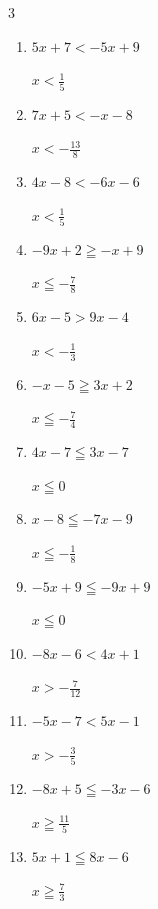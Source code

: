 \begin{multicols}{3}
\begin{enumerate}
        $\displaystyle x\leqq -\frac{7}{15}$

  \item $5x+7<-5x+9$

        $\displaystyle x<\frac{1}{5}$

  \item $7x+5<-x-8$

        $\displaystyle x<-\frac{13}{8}$

  \item $4x-8<-6x-6$

        $\displaystyle x<\frac{1}{5}$

  \item $-9x+2\geqq -x+9$

        $\displaystyle x\leqq -\frac{7}{8}$

  \item $6x-5>9x-4$

        $\displaystyle x<-\frac{1}{3}$

  \item $-x-5\geqq 3x+2$

        $\displaystyle x\leqq -\frac{7}{4}$

  \item $4x-7\leqq 3x-7$

        $\displaystyle x\leqq 0$

  \item $x-8\leqq -7x-9$

        $\displaystyle x\leqq -\frac{1}{8}$

  \item $-5x+9\leqq -9x+9$

        $\displaystyle x\leqq 0$

  \item $-8x-6<4x+1$

        $\displaystyle x>-\frac{7}{12}$

  \item $-5x-7<5x-1$

        $\displaystyle x>-\frac{3}{5}$

  \item $-8x+5\leqq -3x-6$

        $\displaystyle x\geqq \frac{11}{5}$

\columnbreak %

\resetques

  \item $5x+1\leqq 8x-6$

        $\displaystyle x\geqq \frac{7}{3}$


\end{enumerate}
\end{multicols}
